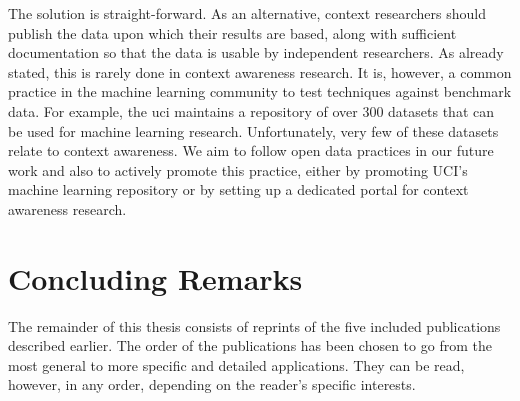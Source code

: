 The solution is straight-forward. As an alternative, context researchers should publish the data upon which their results are based, along with sufficient documentation so that the data is usable by independent researchers. As already stated, this is rarely done in context awareness research. It is, however, a common practice in the machine learning community to test techniques against benchmark data. For example, the \gls{uci} maintains a repository of over 300 datasets that can be used for machine learning research. Unfortunately, very few of these datasets relate to context awareness. We aim to follow open data practices in our future work and also to actively promote this practice, either by promoting UCI's machine learning repository or by setting up a dedicated portal for context awareness research.

\section{Concluding Remarks}
\label{sec:concluding_remarks}

The remainder of this thesis consists of reprints of the five included publications described earlier. The order of the publications has been chosen to go from the most general to more specific and detailed applications. They can be read, however, in any order, depending on the reader's specific interests.

